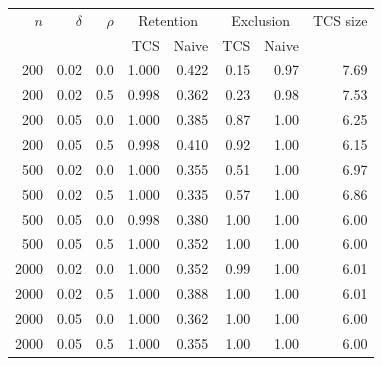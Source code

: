 \begin{tabular}{rrrrrrrr}\toprule
$n$ & $\delta$ & $\rho$ & \multicolumn{2}{c}{Retention} & \multicolumn{2}{c}{Exclusion} & TCS size \\
 & & & TCS & Naive & TCS & Naive & \\\midrule
200 & 0.02 & 0.0 & 1.000 & 0.422 & 0.15 & 0.97 & 7.69 \\
200 & 0.02 & 0.5 & 0.998 & 0.362 & 0.23 & 0.98 & 7.53 \\
200 & 0.05 & 0.0 & 1.000 & 0.385 & 0.87 & 1.00 & 6.25 \\
200 & 0.05 & 0.5 & 0.998 & 0.410 & 0.92 & 1.00 & 6.15 \\
500 & 0.02 & 0.0 & 1.000 & 0.355 & 0.51 & 1.00 & 6.97 \\
500 & 0.02 & 0.5 & 1.000 & 0.335 & 0.57 & 1.00 & 6.86 \\
500 & 0.05 & 0.0 & 0.998 & 0.380 & 1.00 & 1.00 & 6.00 \\
500 & 0.05 & 0.5 & 1.000 & 0.352 & 1.00 & 1.00 & 6.00 \\
2000 & 0.02 & 0.0 & 1.000 & 0.352 & 0.99 & 1.00 & 6.01 \\
2000 & 0.02 & 0.5 & 1.000 & 0.388 & 1.00 & 1.00 & 6.01 \\
2000 & 0.05 & 0.0 & 1.000 & 0.362 & 1.00 & 1.00 & 6.00 \\
2000 & 0.05 & 0.5 & 1.000 & 0.355 & 1.00 & 1.00 & 6.00 \\
\bottomrule\end{tabular}